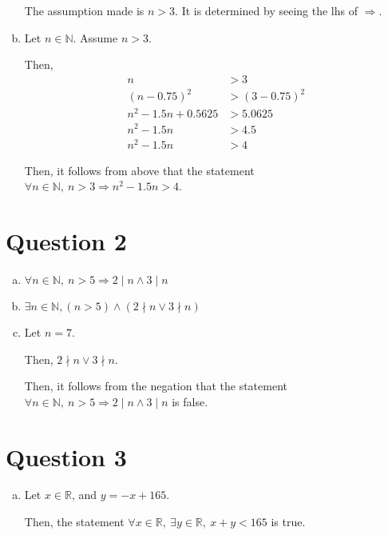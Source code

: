 \documentclass[12pt]{article}
\begin{document}
\begin{enumerate}[a.]
    The assumption made is $n > 3$. It is determined by seeing the lhs of
    $\Rightarrow$.

    \item

    Let $n \in \mathbb{N}$. Assume $n > 3$.

    \bigskip

    Then,
    \setcounter{equation}{0}
    \begin{align}
        n &> 3\\
        (n - 0.75)^2 &> (3 - 0.75)^2\\
        n^2 - 1.5n + 0.5625 &> 5.0625\\
        n^2 - 1.5n &> 4.5\\
        n^2 - 1.5n &> 4
    \end{align}

    \bigskip

    Then, it follows from above that the statement $\forall n \in \mathbb{N},\:
    n > 3 \Rightarrow n^2 - 1.5n > 4$.

\end{enumerate}

\section*{Question 2}
\begin{enumerate}[a.]
    \item

    $\forall n \in \mathbb{N},\:n > 5 \Rightarrow 2 \mid n \land 3 \mid n$

    \item

    $\exists n \in \mathbb{N}, (n > 5) \land (2 \nmid n \lor 3 \nmid n)$

    \item

    Let $n = 7$.

    \bigskip

    Then, $2 \nmid n \lor 3 \nmid n$.

    \bigskip

    Then, it follows from the negation that the statement $\forall n \in \mathbb{N},\:
    n >5 \Rightarrow 2 \mid n \land 3 \mid n$ is false.
\end{enumerate}

\section*{Question 3}
\begin{enumerate}[a.]
    \item

    Let $x \in \mathbb{R}$, and $y = -x + 165$.

    \bigskip

    Then, the statement $\forall x \in \mathbb{R},\: \exists y \in \mathbb{R},\:
    x + y < 165$ is true.


\end{enumerate}
\end{document}
